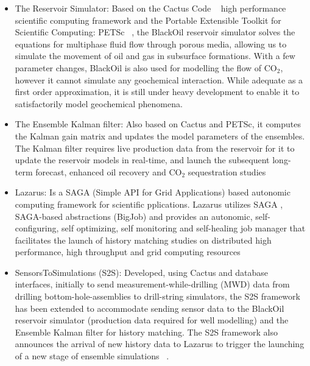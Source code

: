 \documentclass{rspublic}
\begin{document}
\begin{itemize}

\item The Reservoir Simulator: Based on the Cactus Code ~\citep{cactus_web} high 
performance scientific computing framework and the Portable Extensible Toolkit for 
Scientific Computing: PETSc ~\citep{PETSc}, the BlackOil reservoir simulator solves the 
equations for multiphase fluid flow through porous media, allowing us to simulate the 
movement of oil and gas in subsurface formations. With a few parameter changes, BlackOil 
is also used for modelling the flow of CO$_2$, however it cannot 
simulate any geochemical interaction. While adequate as a first order approximation, it is 
still under heavy development to enable it to satisfactorily model geochemical phenomena.

\item The Ensemble Kalman filter: Also based on Cactus and PETSc, it
  computes the Kalman gain matrix and updates the model parameters of
  the ensembles. The Kalman filter requires live production data from
  the reservoir for it to update the reservoir models in real-time,
  and launch the subsequent long-term forecast, enhanced oil recovery
  and CO$_2$ sequestration studies

\item Lazarus: Is a SAGA (Simple API for Grid Applications) based
  autonomic computing framework for scientific pplications. Lazarus
  utilizes SAGA , SAGA-based abstractions (BigJob) and provides an
  autonomic, self-configuring, self optimizing, self monitoring and
  self-healing job manager that facilitates the launch of history
  matching studies on distributed high performance, high throughput
  and grid computing resources ~\citep{gmac}

\item SensorsToSimulations (S2S): Developed, using Cactus and database
  interfaces, initially to send measurement-while-drilling (MWD) data
  from drilling bottom-hole-assemblies to drill-string simulators, the
  S2S framework has been extended to accommodate sending sensor data
  to the BlackOil reservoir simulator (production data required for
  well modelling) and the Ensemble Kalman filter for history
  matching. The S2S framework also announces the arrival of new
  history data to Lazarus to trigger the launching of a new stage of
  ensemble simulations ~\citep{Duff1,Duff2}.

\end{itemize}
\end{document}
